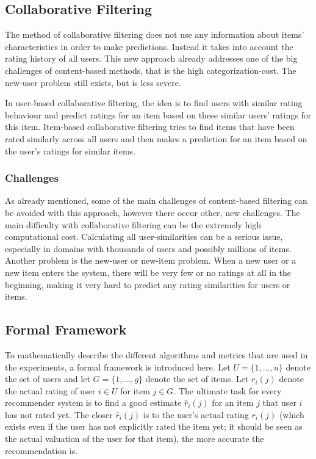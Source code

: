 \subsection{Collaborative Filtering}
\label{sst:collaborativefiltering} The method of collaborative filtering does not use any information about items' characteristics in order to make predictions. Instead it takes into account the rating history of all users. This new approach already addresses one of the big challenges of content-based methods, that is the high categorization-cost. The new-user problem still exists, but is less severe.

In user-based collaborative filtering, the idea is to find users with similar rating behaviour and predict ratings for an item based on these similar users' ratings for this item. Item-based collaborative filtering tries to find items that have been rated similarly across all users and then makes a prediction for an item based on the user's ratings for similar items.

\subsubsection{Challenges}
\label{ssst:challengescf} As already mentioned, some of the main challenges of content-based filtering can be avoided with this approach, however there occur other, new challenges. The main difficulty with collaborative filtering can be the extremely high computational cost. Calculating all user-similarities can be a serious issue, especially in domains with thousands of users and possibly millions of items. Another problem is the new-user or new-item problem. When a new user or a new item enters the system, there will be very few or no ratings at all in the beginning, making it very hard to predict any rating similarities for users or items.

\subsection{Formal Framework}
\label{sst:formalframework} To mathematically describe the different algorithms and metrics that are used in the experiments, a formal framework is introduced here. Let $U = \{1,...,u\}$ denote the set of users and let $G = \{1,...,g\}$ denote the set of items. Let $r_i(j)$ denote the actual rating of user $i \in U$ for item $j \in G$. The ultimate task for every recommender system is to find a good estimate $\hat{r}_i(j)$ for an item $j$ that user $i$ has not rated yet. The closer $\hat{r}_i(j)$ is to the user's actual rating $r_i(j)$ (which exists even if the user has not explicitly rated the item yet; it should be seen as the actual valuation of the user for that item), the more accurate the recommendation is.

